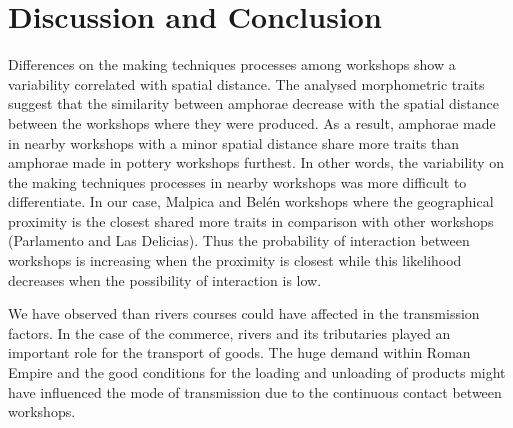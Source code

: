 \documentclass[review]{elsarticle}
\begin{document}
\section{Discussion and Conclusion}

Differences on the making techniques processes among workshops show a variability correlated with spatial distance. The analysed morphometric traits suggest that the similarity between amphorae decrease with the spatial distance between the workshops where they were produced. As a result, amphorae made in nearby workshops with a minor spatial distance share more traits than amphorae made in pottery workshops furthest. In other words, the variability on the making techniques processes in nearby workshops was more difficult to differentiate. In our case, Malpica and Bel\'en workshops where the geographical proximity is the closest shared more traits in comparison with other workshops (Parlamento and Las Delicias). Thus the probability of interaction between workshops is increasing when the proximity is closest while this likelihood decreases when the possibility of interaction is low. 

We have observed than rivers courses could have affected in the transmission factors. In the case of the commerce, rivers and its tributaries played an important role for the transport of goods. The huge demand within Roman Empire and the good conditions for the loading and unloading of products \citep{bevan_mediterranean_2014} might have influenced the mode of transmission due to the continuous contact between workshops. 
\end{document}
